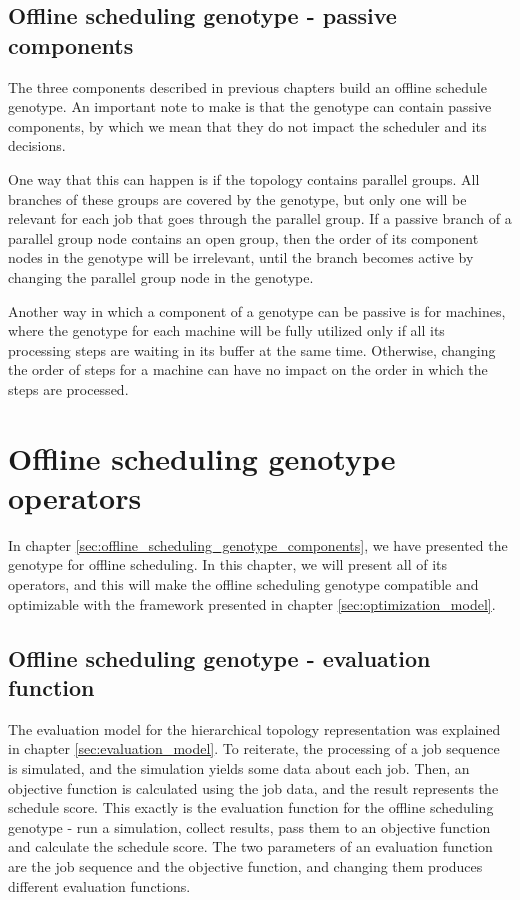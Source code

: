 \subsection{Offline scheduling genotype - passive components}

The three components described in previous chapters build an offline schedule genotype. An important note to make is that the genotype can contain passive components, by which we mean that they do not impact the scheduler and its decisions. 

One way that this can happen is if the topology contains parallel groups. All branches of these groups are covered by the genotype, but only one will be relevant for each job that goes through the parallel group. If a passive branch of a parallel group node contains an open group, then the order of its component nodes in the genotype will be irrelevant, until the branch becomes active by changing the parallel group node in the genotype. 

Another way in which a component of a genotype can be passive is for machines, where the genotype for each machine will be fully utilized only if all its processing steps are waiting in its buffer at the same time. Otherwise, changing the order of steps for a machine can have no impact on the order in which the steps are processed.

\section{Offline scheduling genotype operators}
\label{sec:offline_scheduling_genotype_operators}

In chapter \ref{sec:offline_scheduling_genotype_components}, we have presented the genotype for offline scheduling. In this chapter, we will present all of its operators, and this will make the offline scheduling genotype compatible and optimizable with the framework presented in chapter \ref{sec:optimization_model}.

\subsection{Offline scheduling genotype - evaluation function}
\label{sec:offline_scheduling_genotype_evaluation_function}
The evaluation model for the hierarchical topology representation was explained in chapter \ref{sec:evaluation_model}. To reiterate, the processing of a job sequence is simulated, and the simulation yields some data about each job. Then, an objective function is calculated using the job data, and the result represents the schedule score. This exactly is the evaluation function for the offline scheduling genotype - run a simulation, collect results, pass them to an objective function and calculate the schedule score. The two parameters of an evaluation function are the job sequence and the objective function, and changing them produces different evaluation functions.

